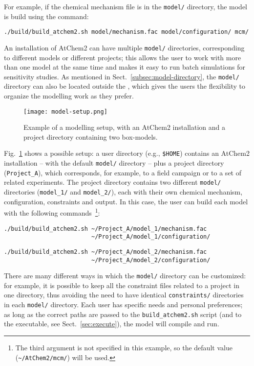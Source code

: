 For example, if the chemical mechanism file is in the \texttt{model/}
directory, the model is build using the command:

\begin{verbatim}
./build/build_atchem2.sh model/mechanism.fac model/configuration/ mcm/
\end{verbatim}

An installation of AtChem2 can have multiple \texttt{model/}
directories, corresponding to different models or different projects;
this allows the user to work with more than one model at the same time
and makes it easy to run batch simulations for sensitivity studies. As
mentioned in Sect.~\ref{subsec:model-directory}, the \texttt{model/}
directory can also be located outside the \maindir, which gives the
users the flexibility to organize the modelling work as they prefer.

\begin{figure}[htb]
  \centering
  \texttt{[image: model-setup.png]}
  \caption{Example of a modelling setup, with an AtChem2 installation
    and a project directory containing two box-models.}
  \label{fig:setup}
\end{figure}

Fig.~\ref{fig:setup} shows a possible setup: a user directory (e.g.,
\texttt{\$HOME}) contains an AtChem2 installation -- with the default
\texttt{model/} directory -- plus a project directory
(\texttt{Project\_A}), which corresponds, for example, to a field
campaign or to a set of related experiments. The project directory
contains two different \texttt{model/} directories (\texttt{model\_1/}
and \texttt{model\_2/}), each with their own chemical mechanism,
configuration, constraints and output. In this case, the user can
build each model with the following commands~\footnote{The third
  argument is not specified in this example, so the default value
  (\texttt{\textasciitilde/AtChem2/mcm/}) will be used.}:

\begin{verbatim}
./build/build_atchem2.sh ~/Project_A/model_1/mechanism.fac
                         ~/Project_A/model_1/configuration/
\end{verbatim}

\begin{verbatim}
./build/build_atchem2.sh ~/Project_A/model_2/mechanism.fac
                         ~/Project_A/model_2/configuration/
\end{verbatim}

There are many different ways in which the \texttt{model/} directory
can be customized: for example, it is possible to keep all the
constraint files related to a project in one directory, thus avoiding
the need to have identical \texttt{constraints/} directories in each
\texttt{model/} directory. Each user has specific needs and personal
preferences; as long as the correct paths are passed to the
\texttt{build\_atchem2.sh} script (and to the executable, see
Sect.~\ref{sec:execute}), the model will compile and run.


